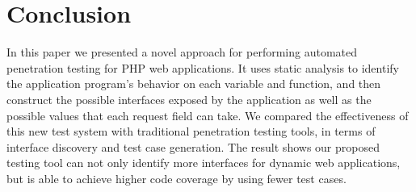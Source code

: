 \chapter{Conclusion}
In this paper we presented a novel approach for performing automated penetration testing for PHP web applications. It uses static analysis to identify the application program's behavior on each variable and function, and then construct the possible interfaces exposed by the application as well as the possible values that each request field can take. We compared the effectiveness of this new test system with traditional penetration testing tools, in terms of interface discovery and test case generation. The result shows our proposed testing tool can not only identify more interfaces for dynamic web applications, but is able to achieve higher code coverage by using fewer test cases.